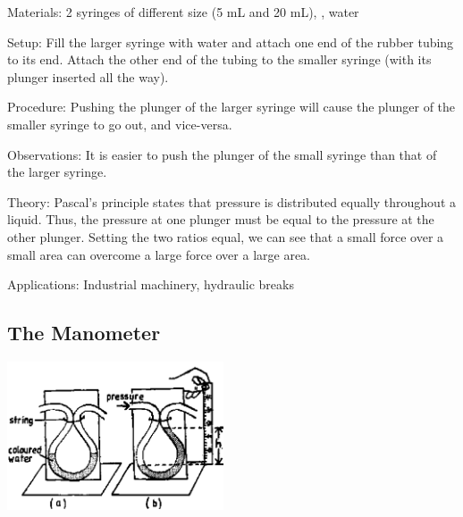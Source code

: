 \begin{multicols}{2}
\begin{description*}
\item[Materials:]{2 syringes of different size (5 mL and 20 mL), , water}
\item[Setup:]{Fill the larger syringe with water and attach one end of the rubber tubing to its end. Attach the other end of the tubing to the smaller syringe (with its plunger inserted all the way).}
\item[Procedure:]{Pushing the plunger of the larger syringe will cause the plunger of the smaller syringe to go out, and vice-versa.}
\item[Observations:]{It is easier to push the plunger of the small syringe than that of the larger syringe.}
\item[Theory:]{Pascal's principle states that pressure is distributed equally throughout a liquid. Thus, the pressure at one plunger must be equal to the pressure at the other plunger. Setting the two ratios equal, we can see that a small force over a small area can overcome a large force over a large area.}
\item[Applications:]{Industrial machinery, hydraulic breaks}
\end{description*}

\subsection{The Manometer} 

\begin{center}
\includegraphics[width=0.48\textwidth]{./img/source/manometer.png}
\end{center}


\end{multicols}
